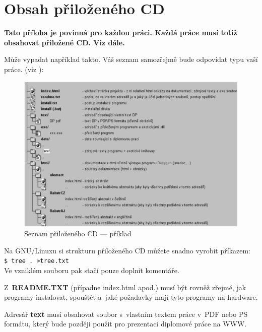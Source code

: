 \documentclass[11pt,twoside,a4paper]{book}
\begin{document}
\chapter{Obsah přiloženého CD}
\textbf{\large Tato příloha je povinná pro každou práci. Každá práce musí totiž obsahovat přiložené CD. Viz dále.}

Může vypadat například takto. Váš seznam samozřejmě bude odpovídat typu vaší práce. (viz \cite{infodp}):

\begin{figure}[h]
\begin{center}
\includegraphics[width=14cm]{figures/seznamcd}
\caption{Seznam přiloženého CD --- příklad}
\label{fig:seznamcd}
\end{center}
\end{figure}

Na GNU/Linuxu si strukturu přiloženého CD můžete snadno vyrobit příkazem:\\ 
\verb|$ tree . >tree.txt|\\
Ve vzniklém souboru pak stačí pouze doplnit komentáře.

Z~\textbf{README.TXT} (případne index.html apod.)  musí být rovněž zřejmé, jak programy instalovat, spouštět a~jaké
požadavky mají tyto programy na hardware.

Adresář \textbf{text}  musí obsahovat soubor s~vlastním textem práce v~PDF nebo PS formátu, který bude později použit
pro prezentaci diplomové práce na WWW.
\end{document}
